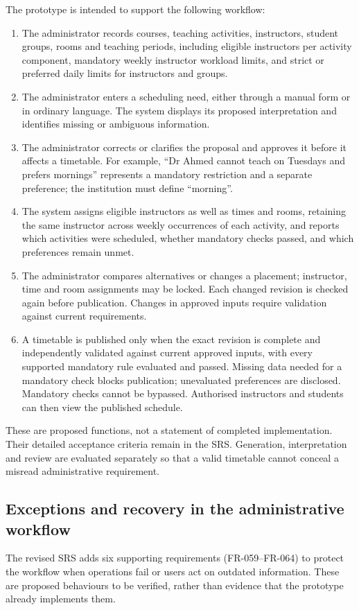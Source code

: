 \documentclass[
  11pt,a4paper,oneside]{report}
\begin{document}
The prototype is intended to support the following workflow:
\begin{enumerate}
\item The administrator records courses, teaching activities, instructors, student groups, rooms and teaching periods, including eligible instructors per activity component, mandatory weekly instructor workload limits, and strict or preferred daily limits for instructors and groups.
\item The administrator enters a scheduling need, either through a manual form or in ordinary language. The system displays its proposed interpretation and identifies missing or ambiguous information.
\item The administrator corrects or clarifies the proposal and approves it before it affects a timetable. For example, ``Dr Ahmed cannot teach on Tuesdays and prefers mornings'' represents a mandatory restriction and a separate preference; the institution must define ``morning''.
\item The system assigns eligible instructors as well as times and rooms, retaining the same instructor across weekly occurrences of each activity, and reports which activities were scheduled, whether mandatory checks passed, and which preferences remain unmet.
\item The administrator compares alternatives or changes a placement; instructor, time and room assignments may be locked. Each changed revision is checked again before publication. Changes in approved inputs require validation against current requirements.
\item A timetable is published only when the exact revision is complete and independently validated against current approved inputs, with every supported mandatory rule evaluated and passed. Missing data needed for a mandatory check blocks publication; unevaluated preferences are disclosed. Mandatory checks cannot be bypassed. Authorised instructors and students can then view the published schedule.
\end{enumerate}
These are proposed functions, not a statement of completed implementation. Their detailed acceptance criteria remain in the SRS. Generation, interpretation and review are evaluated separately so that a valid timetable cannot conceal a misread administrative requirement.

\subsection{Exceptions and recovery in the administrative workflow}
The revised SRS adds six supporting requirements (FR-059--FR-064) to protect the workflow when operations fail or users act on outdated information. These are proposed behaviours to be verified, rather than evidence that the prototype already implements them.
\end{document}
